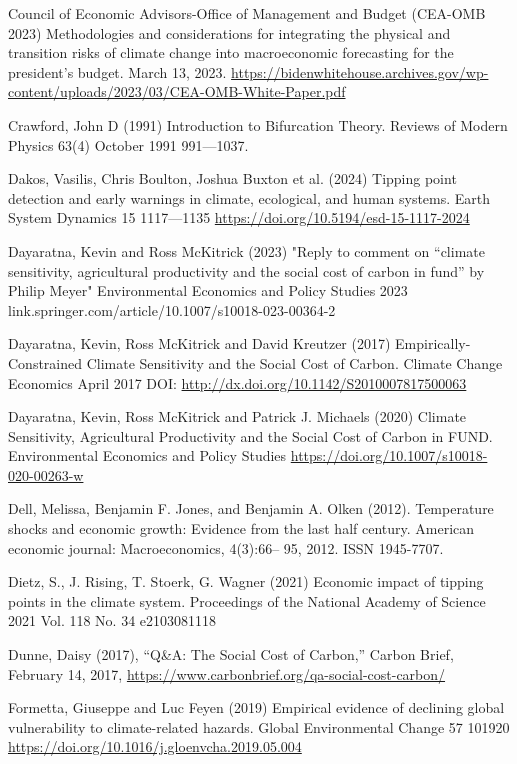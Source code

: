 \documentclass[12pt,paper=a4,DIV=12,parskip=never,chapterprefix=false,headings=standardclasses]{scrreprt}
\begin{document}
Council of Economic Advisors-Office of Management and Budget (CEA-OMB 2023) Methodologies and
considerations for integrating the physical and transition risks of climate change into macroeconomic
forecasting for the president’s budget. March 13, 2023. \url{https://bidenwhitehouse.archives.gov/wp-
content/uploads/2023/03/CEA-OMB-White-Paper.pdf}

Crawford, John D (1991) Introduction to Bifurcation Theory. Reviews of Modern Physics 63(4) October
1991 991—1037.

Dakos, Vasilis, Chris Boulton, Joshua Buxton et al. (2024) Tipping point detection and early warnings in
climate, ecological, and human systems. Earth System Dynamics 15 1117—1135
\url{https://doi.org/10.5194/esd-15-1117-2024}

Dayaratna, Kevin and Ross McKitrick (2023) "Reply to comment on “climate sensitivity, agricultural
productivity and the social cost of carbon in fund” by Philip Meyer" Environmental Economics and
Policy Studies 2023 link.springer.com/article/10.1007/s10018-023-00364-2

Dayaratna, Kevin, Ross McKitrick and David Kreutzer (2017) Empirically-Constrained Climate Sensitivity
and the Social Cost of Carbon. Climate Change Economics April 2017 DOI:
\url{http://dx.doi.org/10.1142/S2010007817500063}

Dayaratna, Kevin, Ross McKitrick and Patrick J. Michaels (2020) Climate Sensitivity, Agricultural
Productivity and the Social Cost of Carbon in FUND. Environmental Economics and Policy Studies
\url{https://doi.org/10.1007/s10018-020-00263-w}

Dell, Melissa, Benjamin F. Jones, and Benjamin A. Olken (2012). Temperature shocks and economic
growth: Evidence from the last half century. American economic journal: Macroeconomics, 4(3):66–
95, 2012. ISSN 1945-7707.

Dietz, S., J. Rising, T. Stoerk, G. Wagner (2021) Economic impact of tipping points in the climate system.
Proceedings of the National Academy of Science 2021 Vol. 118 No. 34 e2103081118

Dunne, Daisy (2017), “Q\&A: The Social Cost of Carbon,” Carbon Brief, February 14, 2017,
\url{https://www.carbonbrief.org/qa-social-cost-carbon/}

Formetta, Giuseppe and Luc Feyen (2019) Empirical evidence of declining global vulnerability to
climate-related hazards. Global Environmental Change 57 101920
\url{https://doi.org/10.1016/j.gloenvcha.2019.05.004}
\end{document}
